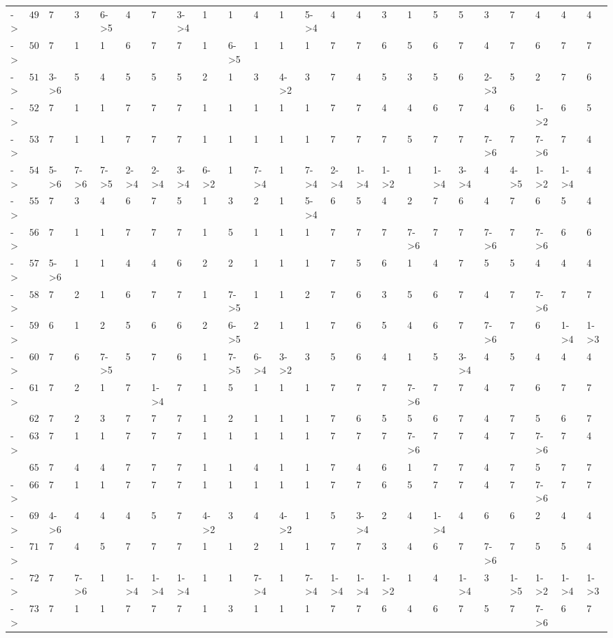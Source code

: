\documentclass[6pt]{article}
\begin{document}
\begin{landscape}
{\begin{longtable}{lrllllllllllllllllllllll}
-\textgreater &$ 49$&7&3&6-\textgreater 5&4&7&3-\textgreater 4&1&1&4&1&5-\textgreater 4&4&4&3&1&5&5&3&7&4&4&4\tabularnewline
-\textgreater &$ 50$&7&1&1&6&7&7&1&6-\textgreater 5&1&1&1&7&7&6&5&6&7&4&7&6&7&7\tabularnewline
-\textgreater &$ 51$&3-\textgreater 6&5&4&5&5&5&2&1&3&4-\textgreater 2&3&7&4&5&3&5&6&2-\textgreater 3&5&2&7&6\tabularnewline
-\textgreater &$ 52$&7&1&1&7&7&7&1&1&1&1&1&7&7&4&4&6&7&4&6&1-\textgreater 2&6&5\tabularnewline
-\textgreater &$ 53$&7&1&1&7&7&7&1&1&1&1&1&7&7&7&5&7&7&7-\textgreater 6&7&7-\textgreater 6&7&4\tabularnewline
-\textgreater &$ 54$&5-\textgreater 6&7-\textgreater 6&7-\textgreater 5&2-\textgreater 4&2-\textgreater 4&3-\textgreater 4&6-\textgreater 2&1&7-\textgreater 4&1&7-\textgreater 4&2-\textgreater 4&1-\textgreater 4&1-\textgreater 2&1&1-\textgreater 4&3-\textgreater 4&4&4-\textgreater 5&1-\textgreater 2&1-\textgreater 4&4\tabularnewline
-\textgreater &$ 55$&7&3&4&6&7&5&1&3&2&1&5-\textgreater 4&6&5&4&2&7&6&4&7&6&5&4\tabularnewline
-\textgreater &$ 56$&7&1&1&7&7&7&1&5&1&1&1&7&7&7&7-\textgreater 6&7&7&7-\textgreater 6&7&7-\textgreater 6&6&6\tabularnewline
-\textgreater &$ 57$&5-\textgreater 6&1&1&4&4&6&2&2&1&1&1&7&5&6&1&4&7&5&5&4&4&4\tabularnewline
-\textgreater &$ 58$&7&2&1&6&7&7&1&7-\textgreater 5&1&1&2&7&6&3&5&6&7&4&7&7-\textgreater 6&7&7\tabularnewline
-\textgreater &$ 59$&6&1&2&5&6&6&2&6-\textgreater 5&2&1&1&7&6&5&4&6&7&7-\textgreater 6&7&6&1-\textgreater 4&1-\textgreater 3\tabularnewline
-\textgreater &$ 60$&7&6&7-\textgreater 5&5&7&6&1&7-\textgreater 5&6-\textgreater 4&3-\textgreater 2&3&5&6&4&1&5&3-\textgreater 4&4&5&4&4&4\tabularnewline
-\textgreater &$ 61$&7&2&1&7&1-\textgreater 4&7&1&5&1&1&1&7&7&7&7-\textgreater 6&7&7&4&7&6&7&7\tabularnewline
&$ 62$&7&2&3&7&7&7&1&2&1&1&1&7&6&5&5&6&7&4&7&5&6&7\tabularnewline
-\textgreater &$ 63$&7&1&1&7&7&7&1&1&1&1&1&7&7&7&7-\textgreater 6&7&7&4&7&7-\textgreater 6&7&4\tabularnewline
&$ 65$&7&4&4&7&7&7&1&1&4&1&1&7&4&6&1&7&7&4&7&5&7&7\tabularnewline
-\textgreater &$ 66$&7&1&1&7&7&7&1&1&1&1&1&7&7&6&5&7&7&4&7&7-\textgreater 6&7&7\tabularnewline
-\textgreater &$ 69$&4-\textgreater 6&4&4&4&5&7&4-\textgreater 2&3&4&4-\textgreater 2&1&5&3-\textgreater 4&2&4&1-\textgreater 4&4&6&6&2&4&4\tabularnewline
-\textgreater &$ 71$&7&4&5&7&7&7&1&1&2&1&1&7&7&3&4&6&7&7-\textgreater 6&7&5&5&4\tabularnewline
-\textgreater &$ 72$&7&7-\textgreater 6&1&1-\textgreater 4&1-\textgreater 4&1-\textgreater 4&1&1&7-\textgreater 4&1&7-\textgreater 4&1-\textgreater 4&1-\textgreater 4&1-\textgreater 2&1&4&1-\textgreater 4&3&1-\textgreater 5&1-\textgreater 2&1-\textgreater 4&1-\textgreater 3\tabularnewline
-\textgreater &$ 73$&7&1&1&7&7&7&1&3&1&1&1&7&7&6&4&6&7&5&7&7-\textgreater 6&6&7\tabularnewline

\end{longtable}}
\end{landscape}
\end{document}
